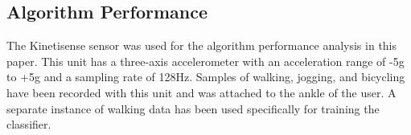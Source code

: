 \documentclass[journal]{IEEEtran}
\begin{document}
\subsection{Algorithm Performance}
%
The Kinetisense sensor was used for the algorithm performance analysis in this paper.
This unit has a three-axis accelerometer with an acceleration range of -5g to +5g and a sampling rate of 128Hz.
Samples of walking, jogging, and bicycling have been recorded with this unit and was attached to the ankle of the user.
A separate instance of walking data has been used specifically for training the classifier.
%
\begin{figure}[!ht]
  \centering
  \quad
  \centering
  \quad
  \centering

\end{figure}
\end{document}
